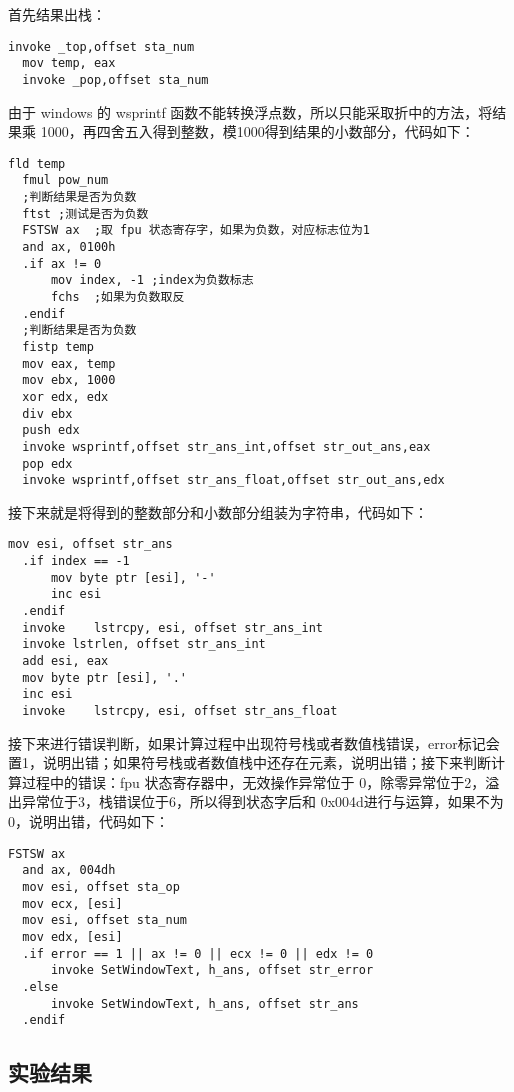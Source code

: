 \documentclass[proposal-report]{bitart}
\begin{document}
首先结果出栈：

\begin{lstlisting}[language={[x86masm]Assembler}]
  invoke _top,offset sta_num
  mov temp, eax
  invoke _pop,offset sta_num
\end{lstlisting}

由于 windows 的 wsprintf 函数不能转换浮点数，所以只能采取折中的方法，将结果乘 1000，再四舍五入得到整数，模1000得到结果的小数部分，代码如下：

\begin{lstlisting}[language={[x86masm]Assembler}]
  fld temp
  fmul pow_num
  ;判断结果是否为负数
  ftst ;测试是否为负数
  FSTSW ax  ;取 fpu 状态寄存字，如果为负数，对应标志位为1
  and ax, 0100h
  .if ax != 0
      mov index, -1 ;index为负数标志
      fchs  ;如果为负数取反
  .endif
  ;判断结果是否为负数
  fistp temp
  mov eax, temp
  mov ebx, 1000
  xor edx, edx
  div ebx
  push edx
  invoke wsprintf,offset str_ans_int,offset str_out_ans,eax
  pop edx
  invoke wsprintf,offset str_ans_float,offset str_out_ans,edx
\end{lstlisting}

接下来就是将得到的整数部分和小数部分组装为字符串，代码如下：

\begin{lstlisting}[language={[x86masm]Assembler}]
  mov esi, offset str_ans 
  .if index == -1
      mov byte ptr [esi], '-'
      inc esi
  .endif
  invoke	lstrcpy, esi, offset str_ans_int
  invoke lstrlen, offset str_ans_int
  add esi, eax
  mov byte ptr [esi], '.'
  inc esi
  invoke	lstrcpy, esi, offset str_ans_float
\end{lstlisting}

接下来进行错误判断，如果计算过程中出现符号栈或者数值栈错误，error标记会置1，说明出错；如果符号栈或者数值栈中还存在元素，说明出错；接下来判断计算过程中的错误：fpu 状态寄存器中，无效操作异常位于 0，除零异常位于2，溢出异常位于3，栈错误位于6，所以得到状态字后和 0x004d进行与运算，如果不为 0，说明出错，代码如下：

\begin{lstlisting}[language={[x86masm]Assembler}]
  FSTSW ax
  and ax, 004dh
  mov esi, offset sta_op
  mov ecx, [esi]
  mov esi, offset sta_num
  mov edx, [esi]
  .if error == 1 || ax != 0 || ecx != 0 || edx != 0
      invoke SetWindowText, h_ans, offset str_error
  .else
      invoke SetWindowText, h_ans, offset str_ans
  .endif
\end{lstlisting}

\subsection{实验结果}
\end{document}
